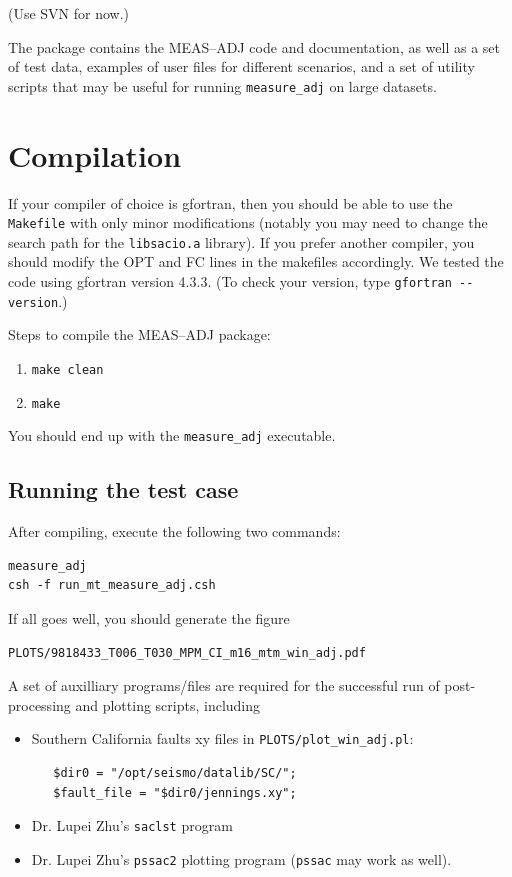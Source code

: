 \documentclass[11pt,titlepage,fleqn]{article}
\begin{document}
(Use SVN for now.)

The package contains the MEAS--ADJ code and documentation, as well as a set of test data, examples of user files for different scenarios, and a set of utility scripts that may be useful for running \verb+measure_adj+ on large datasets.


\section{Compilation}

If your compiler of choice is gfortran, then you should be able to use the \verb+Makefile+ with only minor modifications (notably you may need to change the search path for the {\tt libsacio.a} library).  If you prefer another compiler, you should modify the OPT and FC lines in the makefiles accordingly. We tested the code using gfortran version 4.3.3. (To check your version, type \verb+gfortran --version+.)  

Steps to compile the MEAS--ADJ package:
%
\begin{enumerate}
\item \verb+make clean+
\item \verb+make+
\end{enumerate}

You should end up with the \verb+measure_adj+ executable.


\subsection{Running the test case}

After compiling, execute the following two commands:
%
\begin{verbatim}
measure_adj
csh -f run_mt_measure_adj.csh
\end{verbatim}
%
If all goes well, you should generate the figure
%
\begin{verbatim}
PLOTS/9818433_T006_T030_MPM_CI_m16_mtm_win_adj.pdf
\end{verbatim}

A set of auxilliary programs/files are required for the successful run of
post-processing and plotting scripts, including
\begin{itemize}
 \item Southern California faults xy files in \verb+PLOTS/plot_win_adj.pl+:
\begin{verbatim}
   $dir0 = "/opt/seismo/datalib/SC/";
   $fault_file = "$dir0/jennings.xy";
\end{verbatim}
\item Dr. Lupei Zhu's \verb+saclst+ program 
\item Dr. Lupei Zhu's \verb+pssac2+ plotting program (\verb+pssac+ may work as well). 
\end{itemize}
\end{document}
